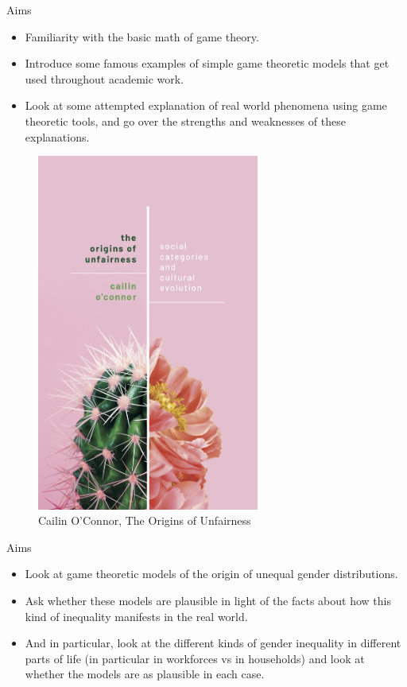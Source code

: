 \documentclass[
  ignorenonframetext,
]{beamer}
\providecommand{\tightlist}{%
  \setlength{\itemsep}{0pt}\setlength{\parskip}{0pt}}
\begin{document}
\begin{frame}{Aims}
\protect\hypertarget{aims}{}
\begin{itemize}
\tightlist
\item
  Familiarity with the basic math of game theory.
\item
  Introduce some famous examples of simple game theoretic models that
  get used throughout academic work.
\item
  Look at some attempted explanation of real world phenomena using game
  theoretic tools, and go over the strengths and weaknesses of these
  explanations.
\end{itemize}
\end{frame}

\begin{frame}
\begin{figure}
\centering
\includegraphics[width=0.65\textwidth,height=0.65\textheight]{images/oconnor_visual.jpg}
\caption{Cailin O'Connor, The Origins of Unfairness}
\end{figure}
\end{frame}

\begin{frame}{Aims}
\protect\hypertarget{aims-1}{}
\begin{itemize}
\tightlist
\item
  Look at game theoretic models of the origin of unequal gender
  distributions.
\item
  Ask whether these models are plausible in light of the facts about how
  this kind of inequality manifests in the real world.
\item
  And in particular, look at the different kinds of gender inequality in
  different parts of life (in particular in workforces vs in households)
  and look at whether the models are as plausible in each case.
\end{itemize}
\end{frame}
\end{document}
